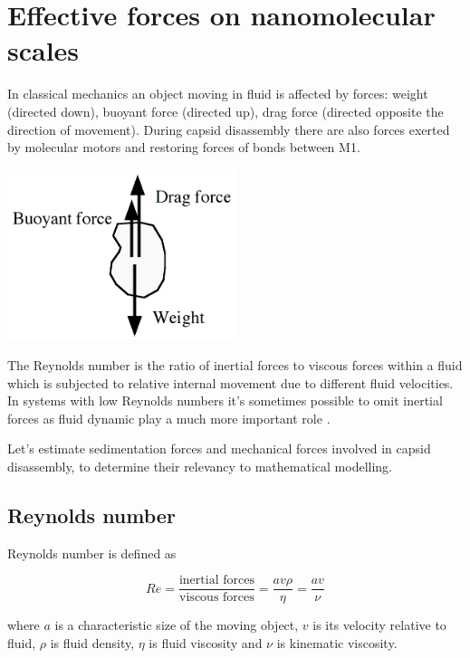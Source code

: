 \section{Effective forces on nanomolecular scales}
\label{appendix:nanomolecular}

In classical mechanics an object moving in fluid is affected by forces: weight (directed down), buoyant force (directed up), drag force (directed opposite the direction of movement). During capsid disassembly there are also forces exerted by molecular motors and restoring forces of bonds between M1.

\begin{center}
\includegraphics[width=0.5\textwidth]{D_chapters/6_appendix/Sedimentation.PNG}
\end{center}

The Reynolds number is the ratio of inertial forces to viscous forces within a fluid which is subjected to relative internal movement due to different fluid velocities. In systems with low Reynolds numbers it's sometimes possible to omit inertial forces as fluid dynamic play a much more important role \cite{purcell1977life}.

Let's estimate sedimentation forces and mechanical forces involved in capsid disassembly, to determine their relevancy to mathematical modelling.

\subsection{Reynolds number}

Reynolds number is defined as

\begin{equation}
Re = \frac{\text{inertial forces}}{\text{viscous forces}} =\frac{av\rho}{\eta} = \frac{av}{\nu}
\end{equation}

where $a$ is a characteristic size of the moving object, $v$ is its velocity relative to fluid, $\rho$ is fluid density, $\eta$ is fluid viscosity and $\nu$ is kinematic viscosity.

